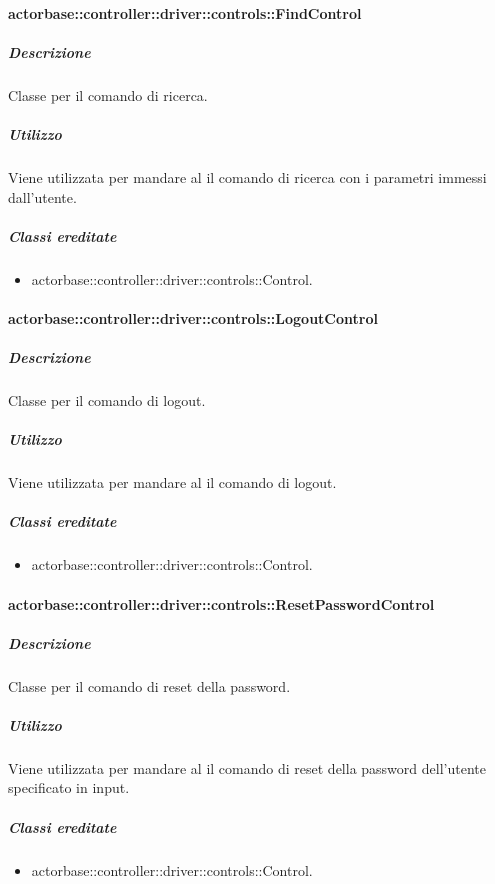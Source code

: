 \documentclass{scalatekids-article}
\begin{document}
\paragraph{actorbase::controller::driver::controls::FindControl}

\subparagraph{Descrizione}

Classe per il comando di ricerca.

\subparagraph{Utilizzo}

Viene utilizzata per mandare al  il comando di ricerca con i
parametri immessi dall'utente.

\subparagraph{Classi ereditate}

\begin{itemize}
\item actorbase::controller::driver::controls::Control.
\end{itemize}

\paragraph{actorbase::controller::driver::controls::LogoutControl}

\subparagraph{Descrizione}

Classe per il comando di logout.

\subparagraph{Utilizzo}

Viene utilizzata per mandare al  il comando di logout.

\subparagraph{Classi ereditate}

\begin{itemize}
\item actorbase::controller::driver::controls::Control.
\end{itemize}

\paragraph{actorbase::controller::driver::controls::ResetPasswordControl}

\subparagraph{Descrizione}

Classe per il comando di reset della password.

\subparagraph{Utilizzo}

Viene utilizzata per mandare al  il comando di reset della
password dell'utente specificato in input.

\subparagraph{Classi ereditate}

\begin{itemize}
\item actorbase::controller::driver::controls::Control.
\end{itemize}
\end{document}
